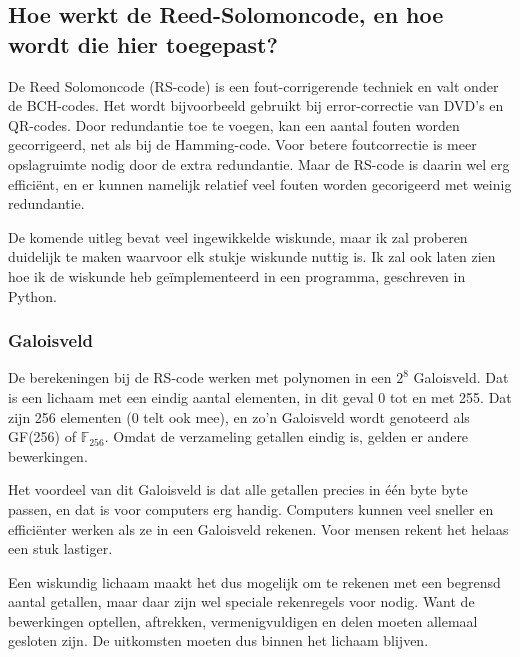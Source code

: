\documentclass[a4paper]{article}
\begin{document}
\subsection{Hoe werkt de Reed-Solomoncode, en hoe wordt die hier toegepast?}
De Reed Solomoncode (RS-code) is een fout-corrigerende techniek en valt onder de BCH-codes. Het wordt bijvoorbeeld gebruikt bij error-correctie van DVD's en QR-codes. Door redundantie toe te voegen, kan een aantal fouten worden gecorrigeerd, net als bij de Hamming-code. Voor betere foutcorrectie is meer opslagruimte nodig door de extra redundantie. Maar de RS-code is daarin wel erg efficiënt, en er kunnen namelijk relatief veel fouten worden gecorigeerd met weinig redundantie. \par
De komende uitleg bevat veel ingewikkelde wiskunde, maar ik zal proberen duidelijk te maken waarvoor elk stukje wiskunde nuttig is. Ik zal ook laten zien hoe ik de wiskunde heb geïmplementeerd in een programma, geschreven in Python.

\subsubsection{Galoisveld}
De berekeningen bij de RS-code werken met polynomen in een $2^8$ Galoisveld. Dat is een lichaam met een eindig aantal elementen, in dit geval 0 tot en met 255. Dat zijn 256 elementen (0 telt ook mee), en zo'n Galoisveld wordt genoteerd als GF(256) of $\mathbb{F}_{256}$. Omdat de verzameling getallen eindig is, gelden er andere bewerkingen.\par
Het voordeel van dit Galoisveld is dat alle getallen precies in één byte byte passen, en dat is voor computers erg handig. Computers kunnen veel sneller en efficiënter werken als ze in een Galoisveld rekenen. Voor mensen rekent het helaas een stuk lastiger.

Een wiskundig lichaam maakt het dus mogelijk om te rekenen met een begrensd aantal getallen, maar daar zijn wel speciale rekenregels voor nodig. Want de bewerkingen optellen, aftrekken, vermenigvuldigen en delen moeten allemaal gesloten zijn. De uitkomsten moeten dus binnen het lichaam blijven.
\end{document}
